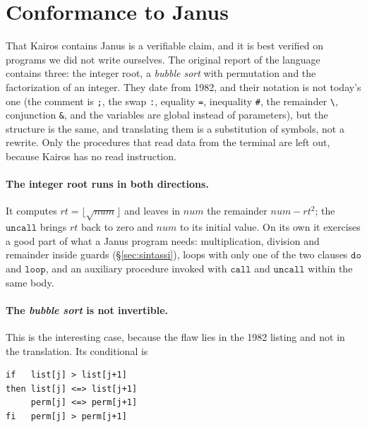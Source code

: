 \section{Conformance to Janus}
\label{sec:conformita}

That Kairos contains Janus is a verifiable claim, and it is best verified
on programs we did not write ourselves. The original report of the
language~\cite{LutzDerby1982} contains three: the integer root, a
\emph{bubble sort} with permutation and the factorization of an integer. They date from
1982, and their notation is not today's one (the comment is \texttt{;}, the
swap \texttt{:}, equality \texttt{=}, inequality \texttt{\#}, the
remainder \texttt{\textbackslash}, conjunction \texttt{\&}, and the variables are
global instead of parameters), but the structure is the same, and translating them is a
substitution of symbols, not a rewrite. Only the procedures
that read data from the terminal are left out, because Kairos has no read
instruction.

\paragraph{The integer root runs in both directions.} It computes
$\mathit{rt} = \lfloor\sqrt{\mathit{num}}\rfloor$ and leaves in $\mathit{num}$
the remainder $\mathit{num} - \mathit{rt}^2$; the $\mathtt{uncall}$ brings
$\mathit{rt}$ back to zero and $\mathit{num}$ to its initial value. On its own it exercises a good part of what a Janus program needs:
multiplication, division and remainder inside guards (\S\ref{sec:sintassi}),
loops with only one of the two clauses $\mathtt{do}$ and $\mathtt{loop}$, and an auxiliary procedure invoked
with $\mathtt{call}$ and $\mathtt{uncall}$ within the same body.

\paragraph{The \emph{bubble sort} is not invertible.} This is the interesting case,
because the flaw lies in the 1982 listing and not in the translation. Its
conditional is

\begin{lstlisting}
if   list[j] > list[j+1]
then list[j] <=> list[j+1]
     perm[j] <=> perm[j+1]
fi   perm[j] > perm[j+1]
\end{lstlisting}

